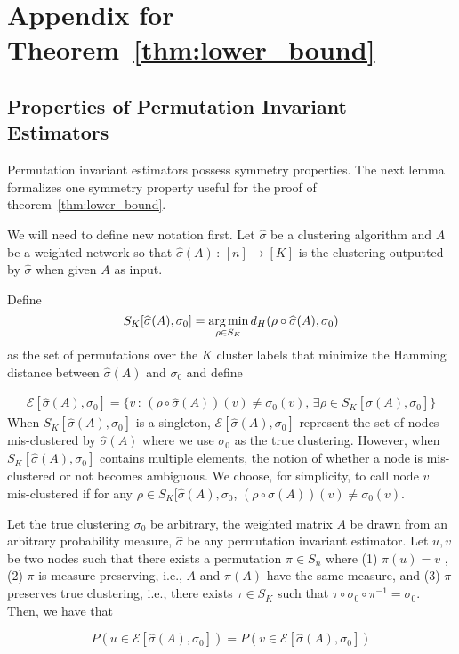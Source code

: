 \documentclass{article}
\begin{document}

\section{Appendix for Theorem~\ref{thm:lower_bound}}
\label{sec:lower_bound_proof}


\subsection*{Properties of Permutation Invariant Estimators}

Permutation invariant estimators possess symmetry properties. The next lemma formalizes one symmetry property useful for the proof of theorem~\ref{thm:lower_bound}. 

We will need to define new notation first. Let $\hat{\sigma}$ be a clustering algorithm and $A$ be a weighted network so that $\hat{\sigma}(A) \,:\, [n] \rightarrow [K]$ is the clustering outputted by $\hat{\sigma}$ when given $A$ as input. 

Define 
\[
S_K[ \widehat{\sigma}(A), \sigma_0] = \mathop{\text{\rm arg\,min}}_{\rho \in S_K} d_H(\rho \circ \widehat{\sigma}(A), \sigma_0) 
\] 
as the set of permutations over the $K$ cluster labels that minimize the Hamming distance between $\hat{\sigma}(A)$ and $\sigma_0$ and define

\begin{align}
\mathcal{E}[ \hat{\sigma}(A), \sigma_0] = \Big\{ v \,:\, (\rho \circ \hat{\sigma}(A))(v) \neq  \sigma_0(v),\, 
          \exists \rho \in S_K[\hat{\sigma}(A), \sigma_0]   \Big\} \label{eqn:error_set_defn}
\end{align}
When $S_K[\hat{\sigma}(A), \sigma_0]$ is a singleton, $\mathcal{E}[\hat{\sigma}(A), \sigma_0]$ represent the set of nodes mis-clustered by $\hat{\sigma}(A)$ where we use $\sigma_0$ as the true clustering. However, when $S_K[\hat{\sigma}(A), \sigma_0]$ contains multiple elements, the notion of whether a node is mis-clustered or not becomes ambiguous. We choose, for simplicity, to call node $v$ mis-clustered if for any $\rho \in S_K[\hat{\sigma}(A), \sigma_0$, $(\rho \circ \hat{\sigma}(A))(v) \neq \sigma_0(v)$.





\begin{lemma}
\label{lem:permutation_invariance_symmetry}
Let the true clustering $\sigma_0$ be arbitrary, the weighted matrix $A$ be drawn from an arbitrary probability measure, $\hat{\sigma}$ be any permutation invariant estimator. Let $u,v$ be two nodes such that there exists a permutation $\pi \in S_n$ where (1) $\pi(u) = v$ , (2) $\pi$ is measure preserving, i.e., $A$ and $\pi(A)$ have the same measure, and (3) $\pi$ preserves true clustering, i.e., there exists $\tau \in S_K$ such that $\tau \circ \sigma_0 \circ \pi^{-1} = \sigma_0$. Then, we have that

\[
P( u \in \mathcal{E}[\hat{\sigma}(A), \sigma_0]) = P( v \in \mathcal{E}[\hat{\sigma}(A), \sigma_0] )
\]
\end{lemma}
\end{document}
